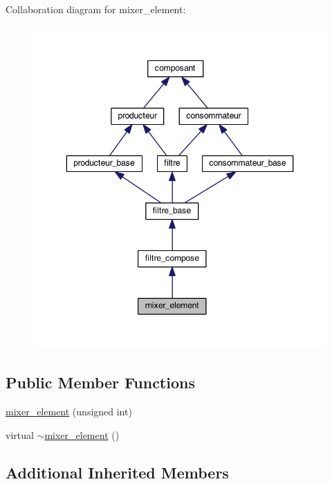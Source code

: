 Collaboration diagram for mixer\-\_\-element\-:
\nopagebreak
\begin{figure}[H]
\begin{center}
\leavevmode
\includegraphics[width=346pt]{classmixer__element__coll__graph}
\end{center}
\end{figure}
\subsection*{Public Member Functions}
\begin{DoxyCompactItemize}
\item 
\hyperlink{classmixer__element_a417a0e6ac3215f0c47935cc1bf9555a0}{mixer\-\_\-element} (unsigned int)
\item 
virtual \hyperlink{classmixer__element_a6d890f4c044c8cecf2340a2f67296113}{$\sim$mixer\-\_\-element} ()
\end{DoxyCompactItemize}
\subsection*{Additional Inherited Members}


